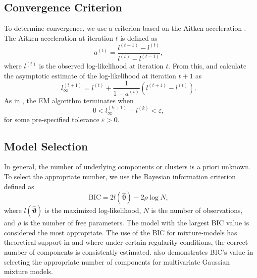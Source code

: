 \documentclass[12pt]{report}
\begin{document}
\subsection{Convergence Criterion}
 To determine convergence, we use a criterion based on the Aitken acceleration \citep{aitken1926}. The Aitken acceleration at iteration $t$ is defined as 
\begin{equation*}
a^{(t)} = \frac{l^{(t+1)} - l^{(t)} }{l^{(t)} - l^{(t-1)}},
\end{equation*}
where $l^{(t)}$ is the observed log-likelihood at iteration $t$. From this, \citet{lindsay1995} and \citet{bohning1994} calculate the asymptotic estimate of the log-likelihood at iteration $t+1$ as
\begin{equation*}
l_{\infty}^{(t+1)} = l^{(t)} + \frac{1}{1- a^{(t)}} (l^{(t+1)} - l^{(t)}).
\end{equation*}
As in \citet{mcnicholas2010}, the EM algorithm terminates when 
\begin{equation*}
0< l_{\infty}^{(k+1)} - l^{(k)} < \varepsilon,
\end{equation*}
for some pre-specified tolerance $\varepsilon > 0$.




\subsection{Model Selection}
In general, the number of underlying components or clusters is a priori unknown. To select the appropriate number, we use the Bayesian information criterion \citep[BIC;][]{schwarz1978} defined as 
\begin{equation*}
\text{BIC} = 2 l(\hat{\bm{\vartheta}}) - 2 \rho \log N,
\end{equation*}
where $l(\hat{\bm{\vartheta}})$ is the maximized log-likelihood, $N$ is the number of observations, and $\rho$ is the number of free parameters. The model with the largest BIC value is considered the most appropriate. The use of the BIC for mixture-models has theoretical support in \citet{leroux1992} and \citet{keribin2000} where under certain regularity conditions, the correct number of components is consistently estimated. \citet{dasgupta1998} also demonstrates BIC's value in selecting the appropriate number of components for multivariate Gaussian mixture models. 
\end{document}
